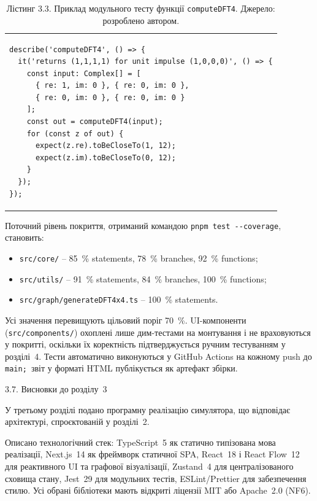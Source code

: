 \documentclass[
]{article}
\begin{document}
\begin{longtable}[]{@{}
  >{\raggedright\arraybackslash}p{}@{}}
\caption{Лістинг 3.3. Приклад модульного тесту функції
\protect\texttt{computeDFT4}. Джерело: розроблено
автором.}\tabularnewline
\toprule\noalign{}
\endfirsthead
\endhead
\bottomrule\noalign{}
\endlastfoot
\begin{minipage}[t]{\linewidth}\raggedright
\begin{verbatim}
describe('computeDFT4', () => {
  it('returns (1,1,1,1) for unit impulse (1,0,0,0)', () => {
    const input: Complex[] = [
      { re: 1, im: 0 }, { re: 0, im: 0 },
      { re: 0, im: 0 }, { re: 0, im: 0 }
    ];
    const out = computeDFT4(input);
    for (const z of out) {
      expect(z.re).toBeCloseTo(1, 12);
      expect(z.im).toBeCloseTo(0, 12);
    }
  });
});
\end{verbatim}
\end{minipage} \\
\end{longtable}

Поточний рівень покриття, отриманий командою
\texttt{pnpm}\texttt{\ }\texttt{test}\texttt{\ -\/-}\texttt{coverage},
становить:

\begin{itemize}
\item
  \texttt{src}\texttt{/}\texttt{core}\texttt{/} -- 85~\% statements,
  78~\% branches, 92~\% functions;
\item
  \texttt{src}\texttt{/}\texttt{utils}\texttt{/} -- 91~\% statements,
  84~\% branches, 100~\% functions;
\item
  \texttt{src}\texttt{/}\texttt{graph}\texttt{/generateDFT4x4.ts} --
  100~\% statements.
\end{itemize}

Усі значення перевищують цільовий поріг 70~\%. UI-компоненти
(\texttt{src}\texttt{/}\texttt{components}\texttt{/}) охоплені лише
дим-тестами на монтування і не враховуються у покритті, оскільки їх
коректність підтверджується ручним тестуванням у розділі~4. Тести
автоматично виконуються у GitHub Actions на кожному push до
\texttt{main}\texttt{;\ }звіт у форматі HTML публікується як артефакт
збірки.

\protect{}\label{_Toc229681163}{}3.7. Висновки до розділу~3

У третьому розділі подано програмну реалізацію симулятора, що відповідає
архітектурі, спроєктованій у розділі~2.

Описано технологічний стек: TypeScript~5 як статично типізована мова
реалізації, Next.js~14 як фреймворк статичної SPA, React~18 і React
Flow~12 для реактивного UI та графової візуалізації, Zustand~4 для
централізованого сховища стану, Jest~29 для модульних тестів,
ESLint/Prettier для забезпечення стилю. Усі обрані бібліотеки мають
відкриті ліцензії MIT або Apache~2.0 (NF6).
\end{document}
